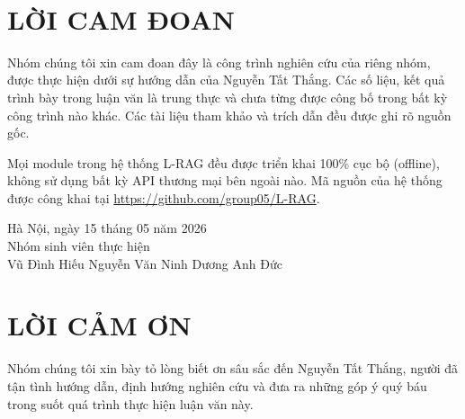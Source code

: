 \documentclass[12pt, a4paper]{report}
\begin{document}
\newpage

\thispagestyle{empty}
\
\newpage

\chapter*{LỜI CAM ĐOAN}

Nhóm chúng tôi xin cam đoan đây là công trình nghiên cứu của riêng nhóm, được thực hiện dưới sự hướng dẫn của Nguyễn Tất Thắng. Các số liệu, kết quả trình bày trong luận văn là trung thực và chưa từng được công bố trong bất kỳ công trình nào khác. Các tài liệu tham khảo và trích dẫn đều được ghi rõ nguồn gốc.

Mọi module trong hệ thống L-RAG đều được triển khai 100\% cục bộ (offline), không sử dụng bất kỳ API thương mại bên ngoài nào. Mã nguồn của hệ thống được công khai tại \url{https://github.com/group05/L-RAG}.

\vspace{2cm}

\begin{flushright}
    Hà Nội, ngày 15 tháng 05 năm 2026\\
    \vspace{1cm}
    Nhóm sinh viên thực hiện\\
    \vspace{2cm}
    Vũ Đình Hiếu \hspace{1cm} Nguyễn Văn Ninh \hspace{1cm} Dương Anh Đức
\end{flushright}

\newpage

\chapter*{LỜI CẢM ƠN}

Nhóm chúng tôi xin bày tỏ lòng biết ơn sâu sắc đến Nguyễn Tất Thắng, người đã tận tình hướng dẫn, định hướng nghiên cứu và đưa ra những góp ý quý báu trong suốt quá trình thực hiện luận văn này.
\end{document}
